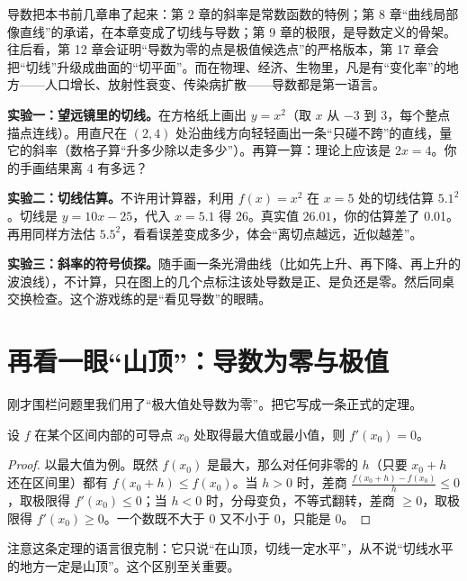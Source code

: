 \begin{lianjie}
导数把本书前几章串了起来：第 2 章的斜率是常数函数的特例；第 8 章“曲线局部像直线”的承诺，在本章变成了切线与导数；第 9 章的极限，是导数定义的骨架。往后看，第 12 章会证明“导数为零的点是极值候选点”的严格版本，第 17 章会把“切线”升级成曲面的“切平面”。而在物理、经济、生物里，凡是有“变化率”的地方——人口增长、放射性衰变、传染病扩散——导数都是第一语言。
\end{lianjie}

\begin{shiyan}
\textbf{实验一：望远镜里的切线。}在方格纸上画出 $y=x^2$（取 $x$ 从 $-3$ 到 $3$，每个整点描点连线）。用直尺在 $(2,4)$ 处沿曲线方向轻轻画出一条“只碰不跨”的直线，量它的斜率（数格子算“升多少除以走多少”）。再算一算：理论上应该是 $2x=4$。你的手画结果离 4 有多远？

\textbf{实验二：切线估算。}不许用计算器，利用 $f(x)=x^2$ 在 $x=5$ 处的切线估算 $5.1^2$。切线是 $y=10x-25$，代入 $x=5.1$ 得 26。真实值 $26.01$，你的估算差了 0.01。再用同样方法估 $5.5^2$，看看误差变成多少，体会“离切点越远，近似越差”。

\textbf{实验三：斜率的符号侦探。}随手画一条光滑曲线（比如先上升、再下降、再上升的波浪线），不计算，只在图上的几个点标注该处导数是正、是负还是零。然后同桌交换检查。这个游戏练的是“看见导数”的眼睛。
\end{shiyan}

\section{再看一眼“山顶”：导数为零与极值}

刚才围栏问题里我们用了“极大值处导数为零”。把它写成一条正式的定理。

\begin{dingli}[极值的必要条件]
设 $f$ 在某个区间内部的可导点 $x_0$ 处取得最大值或最小值，则 $f'(x_0)=0$。
\end{dingli}

\begin{proof}
以最大值为例。既然 $f(x_0)$ 是最大，那么对任何非零的 $h$（只要 $x_0+h$ 还在区间里）都有 $f(x_0+h)\le f(x_0)$。当 $h>0$ 时，差商 $\frac{f(x_0+h)-f(x_0)}{h}\le 0$，取极限得 $f'(x_0)\le 0$；当 $h<0$ 时，分母变负，不等式翻转，差商 $\ge 0$，取极限得 $f'(x_0)\ge 0$。一个数既不大于 0 又不小于 0，只能是 0。
\end{proof}

注意这条定理的语言很克制：它只说“在山顶，切线一定水平”，从不说“切线水平的地方一定是山顶”。这个区别至关重要。

